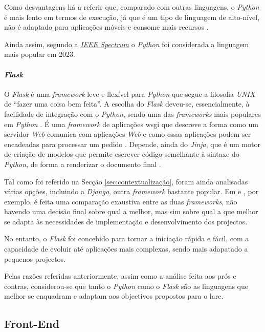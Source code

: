 Como desvantagens há a referir que, comparado com outras linguagens, o \textit{Python} é mais lento em termos de execução, já que é um tipo de linguagem de alto-nível, não é adaptado para aplicações móveis e consome mais recursos \cite{pythonvantagens} \cite{5MainDispython}.

Ainda assim, segundo a \textit{\href{https://spectrum.ieee.org/the-top-programming-languages-2023}{\textit{IEEE Spectrum}}} o \textit{Python} foi considerada a linguagem mais popular em 2023.

\paragraph{\textit{Flask}}
O \textit{Flask} é uma \textit{framework} leve e flexível para \textit{Python} que segue a filosofia \textit{UNIX} de ``fazer uma coisa bem feita''. A escolha do \textit{Flask} deveu-se, essencialmente, à facilidade de integração com o \textit{Python}, sendo uma das \textit{frameworks} mais populares em \textit{Python} \cite{Flask}. É uma \textit{framework} de aplicações \acrfull{wsgi} que descreve a forma como um servidor \textit{Web} comunica com aplicações \textit{Web} e como essas aplicações podem ser encadeadas para processar um pedido \cite{wsgi}. Depende, ainda do  \textit{Jinja}, que é um motor de criação de modelos que permite escrever código semelhante à sintaxe do \textit{Python}, de forma a renderizar o documento final \cite{Jinja}.

Tal como foi referido na Secção \ref{sec:contextualização}, foram ainda analisadas várias opções, incluindo a \textit{Django}, outra \textit{framework} bastante popular. Em \cite{Djangovsflask} e \cite{FlaskvsDjango}, por exemplo, é feita uma comparação exaustiva entre as duas \textit{frameworks}, não havendo uma decisão final sobre qual a melhor, mas sim sobre qual a que melhor se adapta às necessidades de implementação e desenvolvimento dos projectos. 

No entanto, o \textit{Flask} foi concebido para tornar a iniciação rápida e fácil, com a capacidade de evoluir até aplicações mais complexas, sendo mais adapatado a pequenos projectos. 

Pelas razões referidas anteriormente, assim como a análise feita aos prós e contras, considerou-se que tanto o \textit{Python} como o \textit{Flask} são as linguagens que melhor se enquadram e adaptam aos objectivos propostos para o \acrshort{lare}.

\subsection{Front-End}
